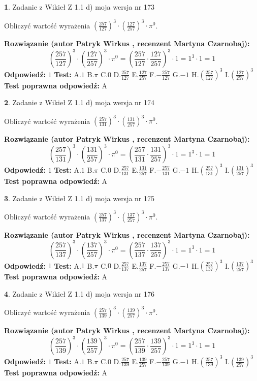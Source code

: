\documentclass[12pt, a4paper]{article}
\theoremstyle{definition} %
\newtheorem{zad}{}
\newcommand{\zadStart}[1]{\begin{zad}#1\newline}
\newcommand{\zadStop}{\end{zad}}
\newcommand{\rozwStart}[2]{\noindent \textbf{Rozwiązanie (autor #1 , recenzent #2): }\newline}
\newcommand{\rozwStop}{\newline}
\newcommand{\odpStart}{\noindent \textbf{Odpowiedź:}\newline}
\newcommand{\odpStop}{\newline}
\newcommand{\testStart}{\noindent \textbf{Test:}\newline}
\newcommand{\testStop}{\newline}
\newcommand{\kluczStart}{\noindent \textbf{Test poprawna odpowiedź:}\newline}
\newcommand{\kluczStop}{\newline}
\begin{document}
\zadStart{Zadanie z Wikieł Z 1.1 d) moja wersja nr 173}

Obliczyć wartość wyrażenia $(\frac{257}{127})^{3} \cdot (\frac{127}{257})^{3} \cdot \pi^{0}$.
\zadStop
\rozwStart{Patryk Wirkus}{Martyna Czarnobaj}
$$(\frac{257}{127})^{3} \cdot (\frac{127}{257})^{3} \cdot \pi^{0} = (\frac{257}{127} \cdot \frac{127}{257})^{3} \cdot 1 = 1^{3} \cdot 1 = 1$$
\rozwStop
\odpStart
$1$
\odpStop
\testStart
A.$1$ B.$\pi$ C.$0$ D.$\frac{257}{127}$ E.$\frac{127}{257}$
F.$-\frac{257}{127}$ G.$-1$
H.$(\frac{257}{127})^{3}$
I.$(\frac{127}{257})^{3}$
\testStop
\kluczStart
A
\kluczStop



\zadStart{Zadanie z Wikieł Z 1.1 d) moja wersja nr 174}

Obliczyć wartość wyrażenia $(\frac{257}{131})^{3} \cdot (\frac{131}{257})^{3} \cdot \pi^{0}$.
\zadStop
\rozwStart{Patryk Wirkus}{Martyna Czarnobaj}
$$(\frac{257}{131})^{3} \cdot (\frac{131}{257})^{3} \cdot \pi^{0} = (\frac{257}{131} \cdot \frac{131}{257})^{3} \cdot 1 = 1^{3} \cdot 1 = 1$$
\rozwStop
\odpStart
$1$
\odpStop
\testStart
A.$1$ B.$\pi$ C.$0$ D.$\frac{257}{131}$ E.$\frac{131}{257}$
F.$-\frac{257}{131}$ G.$-1$
H.$(\frac{257}{131})^{3}$
I.$(\frac{131}{257})^{3}$
\testStop
\kluczStart
A
\kluczStop



\zadStart{Zadanie z Wikieł Z 1.1 d) moja wersja nr 175}

Obliczyć wartość wyrażenia $(\frac{257}{137})^{3} \cdot (\frac{137}{257})^{3} \cdot \pi^{0}$.
\zadStop
\rozwStart{Patryk Wirkus}{Martyna Czarnobaj}
$$(\frac{257}{137})^{3} \cdot (\frac{137}{257})^{3} \cdot \pi^{0} = (\frac{257}{137} \cdot \frac{137}{257})^{3} \cdot 1 = 1^{3} \cdot 1 = 1$$
\rozwStop
\odpStart
$1$
\odpStop
\testStart
A.$1$ B.$\pi$ C.$0$ D.$\frac{257}{137}$ E.$\frac{137}{257}$
F.$-\frac{257}{137}$ G.$-1$
H.$(\frac{257}{137})^{3}$
I.$(\frac{137}{257})^{3}$
\testStop
\kluczStart
A
\kluczStop



\zadStart{Zadanie z Wikieł Z 1.1 d) moja wersja nr 176}

Obliczyć wartość wyrażenia $(\frac{257}{139})^{3} \cdot (\frac{139}{257})^{3} \cdot \pi^{0}$.
\zadStop
\rozwStart{Patryk Wirkus}{Martyna Czarnobaj}
$$(\frac{257}{139})^{3} \cdot (\frac{139}{257})^{3} \cdot \pi^{0} = (\frac{257}{139} \cdot \frac{139}{257})^{3} \cdot 1 = 1^{3} \cdot 1 = 1$$
\rozwStop
\odpStart
$1$
\odpStop
\testStart
A.$1$ B.$\pi$ C.$0$ D.$\frac{257}{139}$ E.$\frac{139}{257}$
F.$-\frac{257}{139}$ G.$-1$
H.$(\frac{257}{139})^{3}$
I.$(\frac{139}{257})^{3}$
\testStop
\kluczStart
A
\kluczStop
\end{document}
